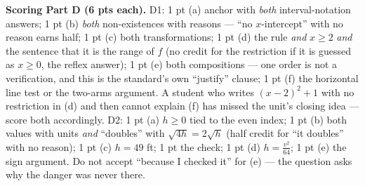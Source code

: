 \documentclass[10pt]{article}
\begin{document}
\begin{teachernote}
\textbf{Scoring Part D (6 pts each).} D1: 1 pt (a) anchor with \emph{both} interval-notation answers;
1 pt (b) \emph{both} non-existences with reasons --- ``no $x$-intercept'' with no reason earns half;
1 pt (c) both transformations; 1 pt (d) the rule \emph{and} $x\ge2$ \emph{and} the sentence that it is
the range of $f$ (no credit for the restriction if it is guessed as $x\ge0$, the reflex answer);
1 pt (e) both compositions --- one order is not a verification, and this is the standard's own
``justify'' clause; 1 pt (f) the horizontal line test or the two-arms argument. A student who writes
$(x-2)^2+1$ with no restriction in (d) and then cannot explain (f) has missed the unit's closing
idea --- score both accordingly. D2: 1 pt (a) $h\ge0$ tied to the even index; 1 pt (b) both values
with units \emph{and} ``doubles'' with $\sqrt{4h}=2\sqrt{h}$ (half credit for ``it doubles'' with no
reason); 1 pt (c) $h=49$ ft; 1 pt the check; 1 pt (d) $h=\frac{v^2}{64}$; 1 pt (e) the sign argument.
Do not accept ``because I checked it'' for (e) --- the question asks why the danger was never there.
\end{teachernote}
\end{document}
